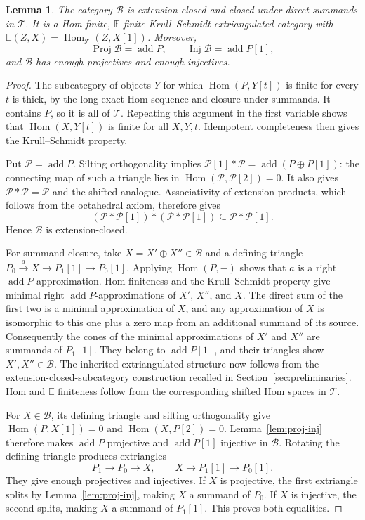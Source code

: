 \documentclass[pdflatex,sn-mathphys-num]{sn-jnl}
\numberwithin{equation}{section}
\newtheorem{lemma}[theorem]{Lemma}
\theoremstyle{definition}
\theoremstyle{remark}\newtheorem{remark}[theorem]{Remark}
\newcommand{\E}{\mathbb E}
\newcommand{\Hom}{\operatorname{Hom}}
\newcommand{\add}{\operatorname{add}}
\begin{document}
\begin{lemma}\label{lem:silting-structure}
The category $\mathcal B$ is extension-closed and closed under
direct summands in $\mathcal T$. It is a Hom-finite, $\E$-finite
Krull--Schmidt extriangulated category with
$\E(Z,X)=\Hom_{\mathcal T}(Z,X[1])$. Moreover,
\[
 \operatorname{Proj}\mathcal B=\add P,\qquad
 \operatorname{Inj}\mathcal B=\add P[1],
\]
and $\mathcal B$ has enough projectives and enough injectives.
\end{lemma}
\begin{proof}
The subcategory of objects $Y$ for which $\Hom(P,Y[t])$ is finite
for every $t$ is thick, by the long exact Hom sequence and closure
under summands. It contains $P$, so it is all of $\mathcal T$.
Repeating this argument in the first variable shows that
$\Hom(X,Y[t])$ is finite for all $X,Y,t$. Idempotent completeness
then gives the Krull--Schmidt property.

Put $\mathcal P=\add P$. Silting orthogonality implies
$\mathcal P[1]*\mathcal P=\add(P\oplus P[1])$: the connecting map
of such a triangle lies in $\Hom(\mathcal P,\mathcal P[2])=0$.
It also gives $\mathcal P*\mathcal P=\mathcal P$ and the shifted
analogue. Associativity of extension products, which follows from
the octahedral axiom, therefore gives
\[
 (\mathcal P*\mathcal P[1])*(\mathcal P*\mathcal P[1])
       \subseteq\mathcal P*\mathcal P[1].
\]
Hence $\mathcal B$ is extension-closed.

For summand closure, take $X=X'\oplus X''\in\mathcal B$ and a
defining triangle $P_0\xrightarrow aX\to P_1[1]\to P_0[1]$.
Applying $\Hom(P,-)$ shows that $a$ is a right $\add P$-approximation.
Hom-finiteness and the Krull--Schmidt property give minimal right
$\add P$-approximations of $X'$, $X''$, and $X$. The direct sum
of the first two is a minimal approximation of $X$, and any
approximation of $X$ is isomorphic to this one plus a zero map
from an additional summand of its source. Consequently the cones
of the minimal approximations of $X'$ and $X''$ are summands of
$P_1[1]$. They belong to $\add P[1]$, and their triangles show
$X',X''\in\mathcal B$. The inherited extriangulated structure now
follows from the extension-closed-subcategory construction recalled
in Section~\ref{sec:preliminaries}. Hom and $\E$ finiteness follow
from the corresponding shifted Hom spaces in $\mathcal T$.

For $X\in\mathcal B$, its defining triangle and silting
orthogonality give $\Hom(P,X[1])=0$ and
$\Hom(X,P[2])=0$. Lemma~\ref{lem:proj-inj} therefore makes
$\add P$ projective and $\add P[1]$ injective in $\mathcal B$.
Rotating the defining triangle produces extriangles
\[
 P_1\longrightarrow P_0\longrightarrow X,
 \qquad X\longrightarrow P_1[1]\longrightarrow P_0[1].
\]
They give enough projectives and injectives. If $X$ is projective,
the first extriangle splits by Lemma~\ref{lem:proj-inj}, making
$X$ a summand of $P_0$. If $X$ is injective, the second splits,
making $X$ a summand of $P_1[1]$. This proves both equalities.
\end{proof}
\end{document}
